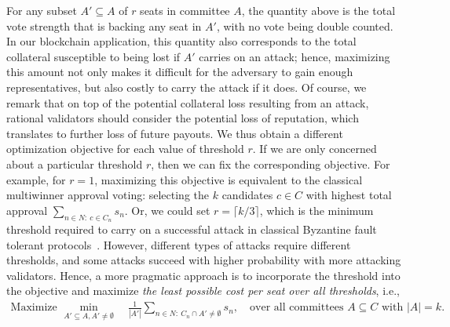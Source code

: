 For any subset $A'\subseteq A$ of $r$ seats in committee $A$, the quantity above is the total vote strength that is backing any seat in $A'$, with no vote being double counted. In our blockchain application, this quantity also corresponds to the total collateral susceptible to being lost if $A'$ carries on an attack; hence, maximizing this amount not only makes it difficult for the adversary to gain enough representatives, but also costly to carry the attack if it does. Of course, we remark that on top of the potential collateral loss resulting from an attack, rational validators should consider the potential loss of reputation, which translates to further loss of future payouts. We thus obtain a different optimization objective for each value of threshold $r$. 
If we are only concerned about a particular threshold $r$, then we can fix the corresponding objective. 
For example, for $r=1$, maximizing this objective is equivalent to the classical multiwinner approval voting: selecting the $k$ candidates $c\in C$ with highest total approval $\sum_{n\in N: \ c\in C_n} s_n$. 
Or, we could set $r=\lceil k/3\rceil$, which is the minimum threshold required to carry on a successful attack in classical Byzantine fault tolerant protocols~\cite{pease1980reaching}. 
However, different types of attacks require different thresholds, and some attacks succeed with higher probability with more attacking validators. Hence, a more pragmatic approach is to incorporate the threshold into the objective and maximize \emph{the least possible cost per seat over all thresholds}, i.e.,  
\begin{align}\label{eq:security}
    \text{Maximize } \min_{A'\subseteq A, A'\neq \emptyset} \quad \frac{1}{|A'|} \sum_{n\in N: \ C_n\cap A' \neq \emptyset} s_n, \quad \text{over all committees $A\subseteq C$ with $|A|=k$}.
\end{align}

